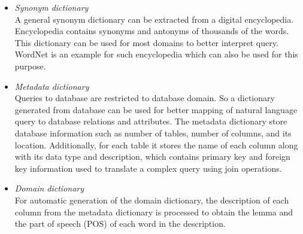 \begin{itemize}
\item \textit{Synonym dictionary}\\
A general synonym dictionary can be extracted from a digital encyclopedia. Encyclopedia contains synonyms and antonyms of thousands of the words. This dictionary can be used for most domains to better interpret query. WordNet\cite{aaa} is an example for such encyclopedia which can also be used for this purpose.

\item \textit{Metadata dictionary}\\
Queries to database are restricted to database domain. So a dictionary generated from database can be used for better mapping of natural language query to database relations and attributes.  The metadata dictionary store database information such as number of tables, number of columns, and its location. Additionally, for each table it stores the name of each column along with its data type and description, which contains primary key and foreign key information used to translate a complex query using join operations.

\item \textit{Domain dictionary}\\
For automatic generation of the domain dictionary, the description of each column from the metadata dictionary is processed to obtain the lemma and the part of speech (POS) of each word in the description.
\end{itemize}


